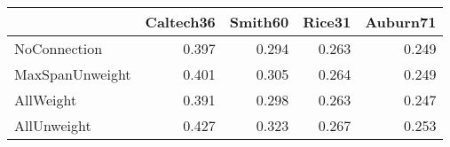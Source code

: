 \begin{tabular}{lrrrr}
\toprule
{} & Caltech36 & Smith60 & Rice31 & Auburn71 \\
\midrule
NoConnection    &     0.397 &   0.294 &  0.263 &    0.249 \\
MaxSpanUnweight &     0.401 &   0.305 &  0.264 &    0.249 \\
AllWeight       &     0.391 &   0.298 &  0.263 &    0.247 \\
AllUnweight     &     0.427 &   0.323 &  0.267 &    0.253 \\
\bottomrule
\end{tabular}
